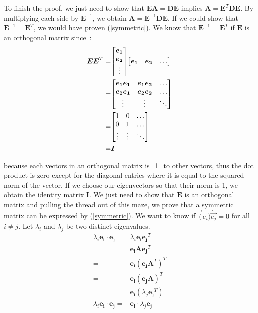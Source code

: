 \documentclass[11pt,twocolumn]{amsart} %
\newcommand{\ve}[1]{\boldsymbol{#1}}
\newcommand{\ma}[1]{\boldsymbol{#1}}
\newenvironment{m}{\begin{bmatrix}}{\end{bmatrix}}
\begin{document}
To finish the proof, we just need to show that $\ma{E}\ma{A} = \ma{D}\ma{E}$ implies $\ma{A} = \ma{E}^T\ma{D}\ma{E}$. By multiplying each side by $\ma{E}^{-1}$, we obtain $\ma{A} = \ma{E}^{-1}\ma{D}\ma{E}$. If we could show that $\ma{E}^{-1} = \ma{E}^T$, we would have proven (\ref{symmetric}). We know that $\ma{E}^{-1} = \ma{E}^T$ if $\ma{E}$ is an orthogonal matrix since~:
\begin{align*}
  \ma{E}\ma{E}^T = & \begin{m} \ve{e_1} \\ \ve{e_2} \\ \vdots \end{m} \begin{m} \ve{e_1} & \ve{e_2} & \hdots \end{m} \\
                 = & \begin{m} \ve{e_1}\ve{e_1} & \ve{e_1}\ve{e_2} & \hdots \\ \ve{e_2}\ve{e_1} & \ve{e_2}\ve{e_2} & \hdots \\ \vdots & \vdots & \ddots \end{m} \\
                 = & \begin{m} 1 & 0 & \hdots \\ 0 & 1 & \hdots \\ \vdots & \vdots & \ddots \end{m} \\
                 = & \ma{I}
\end{align*}

because each vectors in an orthogonal matrix is $\perp$ to other vectors, thus the dot product is zero except for the diagonal entries where it is equal to the squared norm of the vector. If we choose our eigenvectors so that their norm is 1, we obtain the identity matrix $\ma{I}$. We just need to show that $\ma{E}$ is an orthogonal matrix and pulling the thread out of this maze, we prove that a symmetric matrix can be expressed by (\ref{symmetric}). We want to know if $\vec(e_i) \dot \vec{e_j} = 0$ for all $i \not= j$. Let $\lambda_i$ and $\lambda_j$ be two distinct eigenvalues.
\begin{align*}
  \lambda_i\ve{e_i} \cdot \ve{e_j} = & \lambda_i\ve{e_i}\ve{e_j}^T \\
                                  = & \ve{e_i}\ma{A}\ve{e_j}^T \\
                                  = & \ve{e_i}(\ve{e_j}\ma{A}^T)^T \\
                                  = & \ve{e_i}(\ve{e_j}\ma{A})^T \\
                                  = & \ve{e_i}(\lambda_j\ve{e_j}^T) \\
  \lambda_i\ve{e_i} \cdot \ve{e_j} = & \ve{e_i} \cdot \lambda_j\ve{e_j}
\end{align*}
\end{document}
